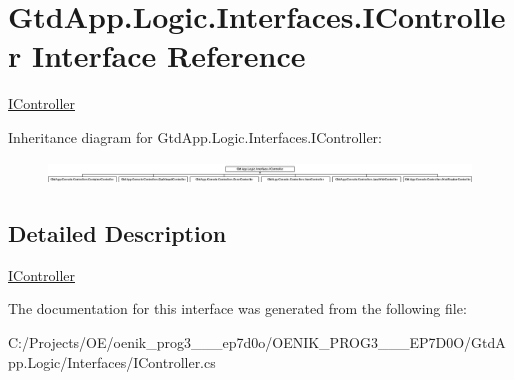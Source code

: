 \hypertarget{interface_gtd_app_1_1_logic_1_1_interfaces_1_1_i_controller}{}\section{Gtd\+App.\+Logic.\+Interfaces.\+I\+Controller Interface Reference}
\label{interface_gtd_app_1_1_logic_1_1_interfaces_1_1_i_controller}


\mbox{\hyperlink{interface_gtd_app_1_1_logic_1_1_interfaces_1_1_i_controller}{I\+Controller}}  


Inheritance diagram for Gtd\+App.\+Logic.\+Interfaces.\+I\+Controller\+:\begin{figure}[H]
\begin{center}
\leavevmode
\includegraphics[height=0.620155cm]{interface_gtd_app_1_1_logic_1_1_interfaces_1_1_i_controller}
\end{center}
\end{figure}


\subsection{Detailed Description}
\mbox{\hyperlink{interface_gtd_app_1_1_logic_1_1_interfaces_1_1_i_controller}{I\+Controller}} 



The documentation for this interface was generated from the following file\+:\begin{DoxyCompactItemize}
\item 
C\+:/\+Projects/\+O\+E/oenik\+\_\+prog3\+\_\+\_\+\_\+ep7d0o/\+O\+E\+N\+I\+K\+\_\+\+P\+R\+O\+G3\+\_\+\_\+\_\+\+E\+P7\+D0\+O/\+Gtd\+App.\+Logic/\+Interfaces/I\+Controller.\+cs\end{DoxyCompactItemize}
